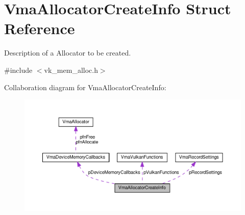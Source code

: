 \hypertarget{structVmaAllocatorCreateInfo}{}\section{Vma\+Allocator\+Create\+Info Struct Reference}
\label{structVmaAllocatorCreateInfo}


Description of a Allocator to be created.  




{\ttfamily \#include $<$vk\+\_\+mem\+\_\+alloc.\+h$>$}



Collaboration diagram for Vma\+Allocator\+Create\+Info\+:\nopagebreak
\begin{figure}[H]
\begin{center}
\leavevmode
\includegraphics[width=350pt]{structVmaAllocatorCreateInfo__coll__graph}
\end{center}
\end{figure}
